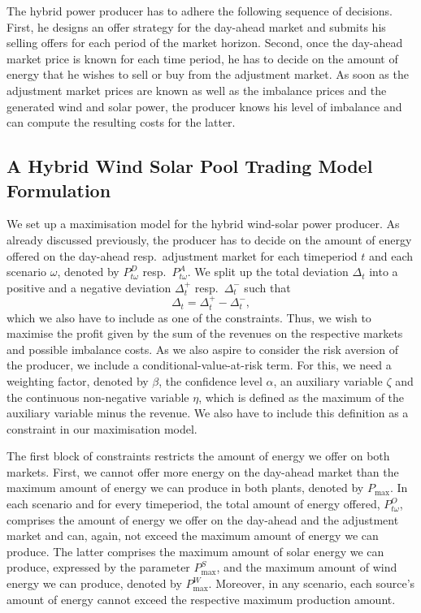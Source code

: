 The hybrid power producer has to adhere the following sequence of decisions. First, he designs an offer strategy for the day-ahead market and submits his selling offers for each period of the market horizon. Second, once the day-ahead market price is known for each time period, he has to decide on the amount of energy that he wishes to sell or buy from the adjustment market. As soon as the adjustment market prices are known as well as the imbalance prices and the generated wind and solar power, the producer knows his level of imbalance and can compute the resulting costs for the latter.



\subsection{ A Hybrid Wind Solar Pool Trading Model Formulation}
We set up a maximisation model for the hybrid wind-solar power producer. As already discussed previously, the producer has to decide on the amount of energy offered on the day-ahead resp.\ adjustment market for each timeperiod $t$ and each scenario $\omega$, denoted by $P^{D}_{t \omega}$ resp.\ $P^{A}_{t \omega}$. We split up the total deviation $\Delta_{t}$ into a positive and a negative deviation $\Delta_{t}^{+}$ resp.\ $\Delta_{t}^{-}$ such that
\begin{equation*}
	\Delta_{t}=\Delta_{t}^{+}-\Delta_{t}^{-},
\end{equation*}
which we also have to include as one of the constraints. Thus, we wish to maximise the profit given by the sum of the revenues on the respective markets and possible imbalance costs. As we also aspire to consider the risk aversion of the producer, we include a conditional-value-at-risk term. For this, we need a weighting factor, denoted by $\beta$, the confidence level $\alpha$, an auxiliary variable $\zeta$ and the continuous non-negative variable $\eta$, which is defined as the maximum of the auxiliary variable minus the revenue. We also have to include this definition as a constraint in our maximisation model. 

The first block of constraints restricts the amount of energy we offer on both markets. First, we cannot offer more energy on the day-ahead market than the maximum amount of energy we can produce in both plants, denoted by $P_{\max}$. In each scenario and for every timeperiod, the total amount of energy offered, $P^{O}_{t \omega}$, comprises the amount of energy we offer on the day-ahead and the adjustment market and can, again, not exceed the maximum amount of energy we can produce. The latter comprises the maximum amount of solar energy we can produce, expressed by the parameter $P_{\max}^{S}$, and the maximum amount of wind energy we can produce, denoted by $P_{\max}^{W}$. Moreover, in any scenario, each source's amount of energy cannot exceed the respective maximum production amount. 

